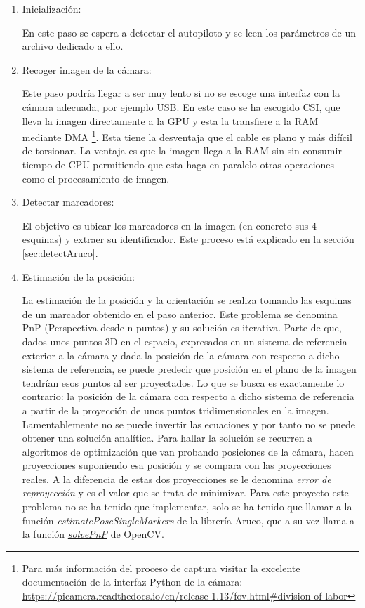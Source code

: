 \begin{enumerate}
\item Inicialización:

	En este paso se espera a detectar el autopiloto y se leen los parámetros de un archivo dedicado a ello.

\item Recoger imagen de la cámara: 

	Este paso podría llegar a ser muy lento si no se escoge una interfaz con la cámara adecuada, por ejemplo USB. En este caso se ha escogido CSI, que lleva la imagen directamente a la GPU y esta la transfiere a la RAM mediante DMA \footnote{Para más información del proceso de captura visitar la excelente documentación de la interfaz Python de la cámara: \url{https://picamera.readthedocs.io/en/release-1.13/fov.html\#division-of-labor}}. Esta tiene la desventaja que el cable es plano y más difícil de torsionar. La ventaja es que la imagen llega a la RAM sin sin consumir tiempo de CPU permitiendo que esta haga en paralelo otras operaciones como el procesamiento de imagen.

\item Detectar marcadores: 

	El objetivo es ubicar los marcadores en la imagen (en concreto sus 4 esquinas) y extraer su identificador.  Este proceso está explicado en la sección \ref{sec:detectAruco}. 

\item Estimación de la posición:

	La estimación de la posición y la orientación se realiza tomando las esquinas de un marcador obtenido en el paso anterior. Este problema se denomina PnP (Perspectiva desde n puntos) y su solución es iterativa. Parte de que, dados unos puntos 3D en el espacio, expresados en un sistema de referencia exterior a la cámara y dada la posición de la cámara con respecto a dicho sistema de referencia, se puede predecir que posición en el plano de la imagen tendrían esos puntos al ser proyectados. Lo que se busca es exactamente lo contrario: la posición de la cámara con respecto a dicho sistema de referencia a partir de la proyección de unos puntos tridimensionales en la imagen. Lamentablemente no se puede invertir las ecuaciones y por tanto no se puede obtener una solución analítica. Para hallar la solución se recurren a algoritmos de optimización que van probando posiciones de la cámara, hacen proyecciones suponiendo esa posición y se compara con las proyecciones reales. A la diferencia de estas dos proyecciones se le denomina \textit{error de reproyección} y es el valor que se trata de minimizar. Para este proyecto este problema no se ha tenido que implementar, solo se ha tenido que llamar a la función \textit{estimatePoseSingleMarkers} de la librería Aruco, que a su vez llama a la función \href{https://docs.opencv.org/4.5.0/d9/d0c/group\_\_calib3d.html\#ga549c2075fac14829ff4a58bc931c033d}{\textit{solvePnP}} de OpenCV.


\end{enumerate}
